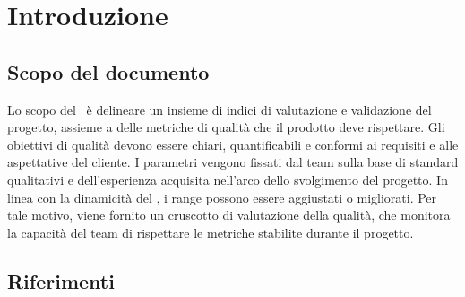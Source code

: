 \section{Introduzione}

\subsection{Scopo del documento}
\par Lo scopo del \PdQ\ è delineare un insieme di indici di valutazione e validazione del progetto, assieme a delle metriche di qualità che il prodotto deve rispettare. Gli obiettivi di qualità devono essere chiari, quantificabili e conformi ai requisiti e alle aspettative del cliente. I parametri vengono fissati dal team sulla base di standard qualitativi e dell'esperienza acquisita nell'arco dello svolgimento del progetto. In linea con la dinamicità del \PdQ, i range possono essere aggiustati o migliorati. Per tale motivo, viene fornito un cruscotto di valutazione della qualità, che monitora la capacità del team di rispettare le metriche stabilite durante il progetto.

\subsection{Riferimenti}


